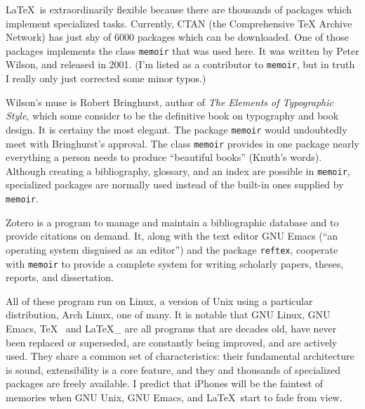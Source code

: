 LaTeX is extraordinarily flexible because there are thousands of packages which implement specialized tasks. Currently, CTAN (the Comprehensive TeX Archive Network) has just shy of 6000 packages which can be downloaded. One of those packages implements the class \texttt{memoir} that was used here. It was written by Peter Wilson, and released in 2001. (I'm listed as a contributor to \texttt{memoir}, but in truth I really only just corrected some minor typos.)
\newpage
\begin{center}
  \textbf{\quad\quad{}\quad\quad{}\quad\quad{}\quad\quad{}}
\end{center}
Wilson's muse is Robert Bringhurst, author of \textit{The Elements of Typographic Style}, which some consider to be the definitive book on typography and book design. It is certainy the most elegant. The package \texttt{memoir} would undoubtedly meet with Bringhurst's approval.  The class \texttt{memoir} provides in one package nearly everything a person needs to produce ``beautiful books'' (Knuth's words). Although creating a bibliography, glossary, and an index are possible in \texttt{memoir}, specialized packages are normally used instead of the built-in ones supplied by \texttt{memoir}.
\begin{center}
  \textbf{\quad\quad{}\quad\quad{}\quad\quad{}\quad\quad{}}
\end{center}
Zotero is a program to manage and maintain a bibliographic database and to provide citations on demand. It, along with the text editor GNU Emacs (``an operating system disguised as an editor'') and the package \texttt{reftex}, cooperate with \texttt{memoir} to provide a complete system for writing scholarly papers, theses, reports, and dissertation.
\begin{center}
  \textbf{\quad\quad{}\quad\quad{}\quad\quad{}\quad\quad{}}
\end{center}
All of these program run on Linux, a version of Unix using a particular distribution, Arch Linux, one of many. It is notable that GNU Linux, GNU Emacs, \TeX  and \LaTeX\_ are all programs that are decades old, have never been replaced or superseded, are constantly being improved, and are actively used. They share a common set of characteristics: their fundamental architecture is sound, extensibility is a core feature, and they and thousands of specialized packages are freely available. I predict that iPhones will be the faintest of memories when GNU Unix, GNU Emacs, and \LaTeX start to fade from view.
